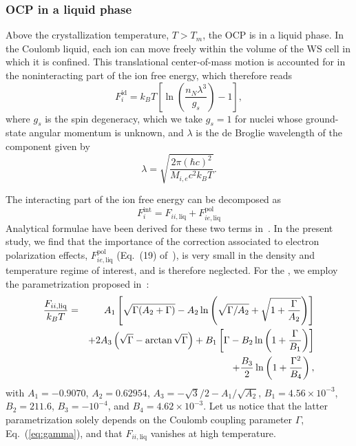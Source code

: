 \subsubsection{OCP in a liquid phase}

Above the crystallization temperature, $T > T_m$, the OCP is in a liquid phase.
In the Coulomb liquid, each ion can move freely within the volume of the WS 
cell in which it is confined. This translational center-of-mass motion is
accounted for in the noninteracting part of the ion free energy, which
therefore reads~\cite{Haensel2007}
%
\begin{equation}
  F_i^{\text{id}} = k_B T 
  \left[\ln\left(\frac{n_N\lambda^3}{g_s}\right) - 1\right]\label{eq:fliqid},
\end{equation}
%
where $g_s$ is the spin degeneracy, which we take $g_s=1$ for nuclei whose
ground-state angular momentum is unknown, and $\lambda$ is the de Broglie
wavelength of the component given by
%
\begin{equation}
  \lambda = \sqrt{\frac{2\pi(\hbar c)^2}{M_{i,e}c^2 k_B T}}.
\end{equation}
%

The interacting part of the ion free energy can be decomposed
as~\cite{Fantina2020}
%
\begin{equation}
  F_i^{\text{int}} = F_{ii,\text{liq}} +
  F_{ie,\text{liq}}^{\text{pol}}\label{eq:fiintliq}
\end{equation}
%
Analytical formulae have been derived for these two terms 
in~\cite{Potekhin2000}.
In the present study, we find that the importance of the correction
associated to electron polarization effects, 
$F_{ie,\text{liq}}^{\text{pol}}$ (Eq.~(19) of~\cite{Potekhin2000}), is very 
small in the density and temperature regime of interest, and is therefore 
neglected. 
%
%
For the , we employ the 
parametrization proposed in~\cite{Potekhin2000}: 
%
\begin{eqnarray}
  \frac{F_{ii,\text{liq}}}{k_B T} 
  &=& A_1\left[\sqrt{\Gamma(A_2+\Gamma)} - A_2\ln\left(\sqrt{\Gamma/A_2} 
+ \sqrt{1+\frac{\Gamma}{A_2}}\right)\right]\notag\\
  &&+ 2A_3\left(\sqrt{\Gamma} - \arctan\sqrt{\Gamma}\right) 
  + B_1\left[\Gamma-B_2\ln\left(1+\frac{\Gamma}{B_1}\right)\right]\notag\\
  &&+ \frac{B_3}{2}\ln\left(1+\frac{\Gamma^2}{B_4}\right),
\end{eqnarray}
%
with $A_1=-0.9070$, $A_2=0.62954$, $A_3=-\sqrt{3}/2-A_1/\sqrt{A_2}$,
$B_1=4.56\times 10^{-3}$, $B_2=211.6$, $B_3=-10^{-4}$, and $B_4=4.62\times
10^{-3}$. Let us notice that the latter parametrization 
solely depends on the Coulomb coupling parameter $\Gamma$, 
Eq.~(\ref{eq:gamma}), and that $F_{ii,\text{liq}}$ vanishes at high 
temperature.

